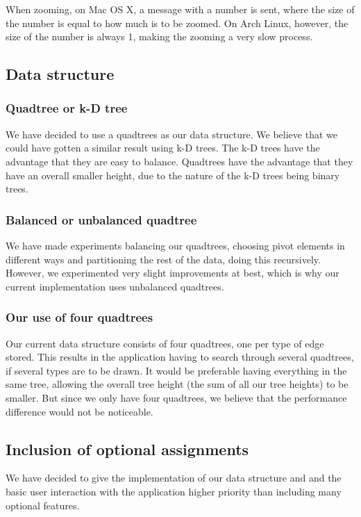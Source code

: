 \documentclass[a4paper,11pt]{article}
\begin{document}
When zooming, on Mac OS X, a message with a number is sent, where the size of the number is equal to how much is to be zoomed. On Arch Linux, however, the size of the number is always 1, making the zooming a very slow process.

\subsection{Data structure} %

\subsubsection{Quadtree or k-D tree} %
We have decided to use a quadtrees as our data structure. We believe that we could have gotten a similar result using k-D trees. The k-D trees have the advantage that they are easy to balance. Quadtrees have the advantage that they have an overall smaller height, due to the nature of the k-D trees being binary trees.

\subsubsection{Balanced or unbalanced quadtree} %
We have made experiments balancing our quadtrees, choosing pivot elements in different ways and partitioning the rest of the data, doing this recursively. However, we experimented very slight improvements at best, which is why our current implementation uses unbalanced quadtrees.

\subsubsection{Our use of four quadtrees} %
Our current data structure consists of four quadtrees, one per type of edge stored. This results in the application having to search through several quadtrees, if several types are to be drawn. It would be preferable having everything in the same tree, allowing the overall tree height (the sum of all our tree heights) to be smaller. But since we only have four quadtrees, we believe that the performance difference would not be noticeable.

\subsection{Inclusion of optional assignments} %
We have decided to give the implementation of our data structure and and the basic user interaction with the application higher priority than including many optional features.
\end{document}
